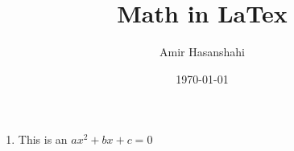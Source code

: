 \documentclass{article}
\title{Math in LaTex}
\author{Amir Hasanshahi}
\date{\today}
\begin{document}
	\maketitle
	
    \begin{enumerate}
        \item This is an  $ax^2 + bx + c = 0$ 
    \end{enumerate}
\end{document}
